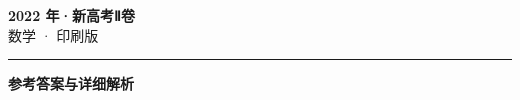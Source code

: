 \documentclass[zihao=5, a4paper]{ctexart}
\begin{document}
\begin{center}
  {\Large\bfseries 2022 年·新高考Ⅱ卷}\\[4pt]
  {\large 数学 · 印刷版}
\end{center}
\medskip
{}

\par\bigskip\hrule\bigskip
{}
\begin{center}{\large\bfseries 参考答案与详细解析}\end{center}
\smallskip

\end{document}
